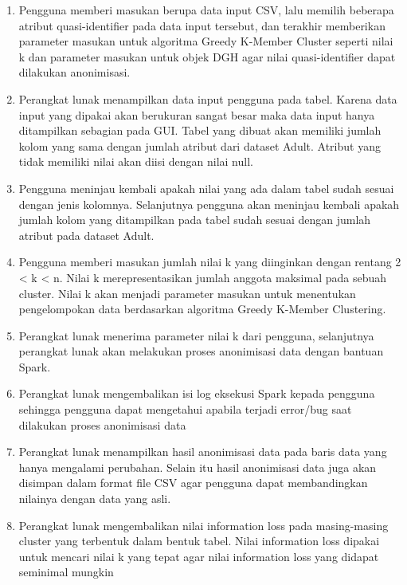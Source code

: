 \begin{enumerate}

\item Pengguna memberi masukan berupa data input CSV, lalu memilih beberapa atribut quasi-identifier pada data input tersebut, dan terakhir memberikan parameter masukan untuk algoritma Greedy K-Member Cluster seperti nilai k dan parameter masukan untuk objek DGH agar nilai quasi-identifier dapat dilakukan anonimisasi. 

\item Perangkat lunak menampilkan data input pengguna pada tabel. Karena data input yang dipakai akan berukuran sangat besar maka data input hanya ditampilkan sebagian pada GUI. Tabel yang dibuat akan memiliki jumlah kolom yang sama dengan jumlah atribut dari dataset Adult. Atribut yang tidak memiliki nilai akan diisi dengan nilai null.

\item Pengguna meninjau kembali apakah nilai yang ada dalam tabel sudah sesuai dengan jenis kolomnya. Selanjutnya pengguna akan meninjau kembali apakah jumlah kolom yang ditampilkan pada tabel sudah sesuai dengan jumlah atribut pada dataset Adult.

\item Pengguna memberi masukan jumlah nilai k yang diinginkan dengan rentang 2 < k < n. Nilai k merepresentasikan jumlah anggota maksimal pada sebuah cluster. Nilai k akan menjadi parameter masukan untuk menentukan pengelompokan data berdasarkan algoritma Greedy K-Member Clustering.

\item Perangkat lunak menerima parameter nilai k dari pengguna, selanjutnya perangkat lunak akan melakukan proses anonimisasi data dengan bantuan Spark. 

\item Perangkat lunak mengembalikan isi log eksekusi Spark kepada pengguna sehingga pengguna dapat mengetahui apabila terjadi error/bug saat dilakukan proses anonimisasi data

\item Perangkat lunak menampilkan hasil anonimisasi data pada baris data yang hanya mengalami perubahan. Selain itu hasil anonimisasi data juga akan disimpan dalam format file CSV agar pengguna dapat membandingkan nilainya dengan data yang asli.

\item Perangkat lunak mengembalikan nilai information loss pada masing-masing cluster yang terbentuk dalam bentuk tabel. Nilai information loss dipakai untuk mencari nilai k yang tepat agar nilai information loss yang didapat seminimal mungkin


\end{enumerate}
